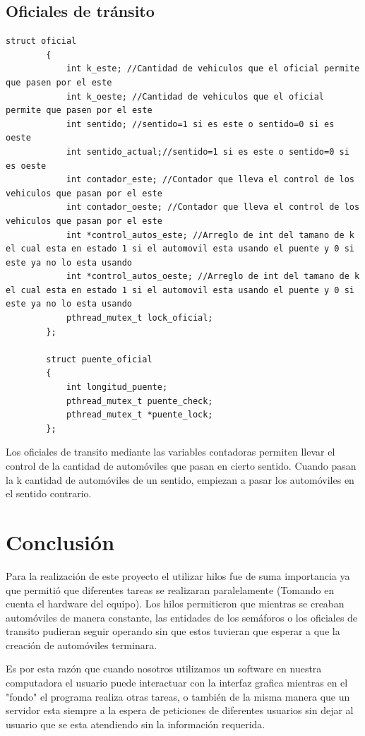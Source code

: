 \documentclass[16pt,a4papper]{article}
\begin{document}
	\subsection{Oficiales de tránsito}
	
	\begin{lstlisting}[style=CStyle]
		struct oficial
		{
			int k_este; //Cantidad de vehiculos que el oficial permite que pasen por el este
			int k_oeste; //Cantidad de vehiculos que el oficial permite que pasen por el este
			int sentido; //sentido=1 si es este o sentido=0 si es oeste
			int sentido_actual;//sentido=1 si es este o sentido=0 si es oeste
			int contador_este; //Contador que lleva el control de los vehiculos que pasan por el este
			int contador_oeste; //Contador que lleva el control de los vehiculos que pasan por el este
			int *control_autos_este; //Arreglo de int del tamano de k el cual esta en estado 1 si el automovil esta usando el puente y 0 si este ya no lo esta usando
			int *control_autos_oeste; //Arreglo de int del tamano de k el cual esta en estado 1 si el automovil esta usando el puente y 0 si este ya no lo esta usando
			pthread_mutex_t lock_oficial;
		};
		
		struct puente_oficial
		{
			int longitud_puente;
			pthread_mutex_t puente_check;
			pthread_mutex_t *puente_lock;
		};
	\end{lstlisting}

	Los oficiales de transito mediante las variables contadoras permiten llevar el control de la cantidad de automóviles que pasan en cierto sentido. Cuando pasan la k cantidad de automóviles de un sentido, empiezan a pasar los automóviles en el sentido contrario.\par
		
	\newpage
	\section{Conclusión}
	Para la realización de este proyecto el utilizar hilos fue de suma importancia ya que permitió que diferentes tareas se realizaran paralelamente (Tomando en cuenta el hardware del equipo). Los hilos permitieron que mientras se creaban automóviles de manera constante, las entidades de los semáforos o los oficiales de transito pudieran seguir operando sin que estos tuvieran que esperar a que la creación de automóviles terminara.\par
	
	Es por esta razón que cuando nosotros utilizamos un software en nuestra computadora el usuario puede interactuar con la interfaz grafica mientras en el "fondo" el programa realiza otras tareas, o también de la misma manera que un servidor esta siempre a la espera de peticiones de diferentes usuarios sin dejar al usuario que se esta atendiendo sin la información requerida.\par
	
\end{document}
